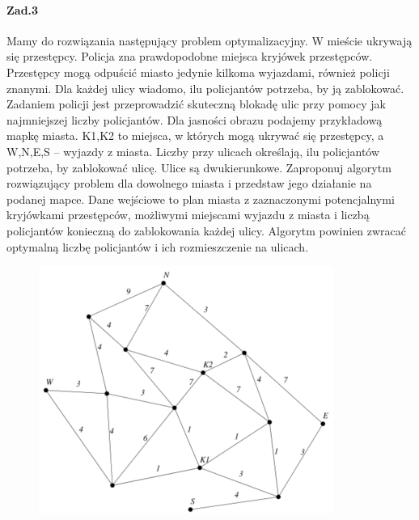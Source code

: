\documentclass[a4paper,12pt]{article}
\theoremstyle{definition}%
\theoremstyle{definition}
\theoremstyle{problem}
\begin{document}
\paragraph{Zad.3} Mamy do rozwiązania następujący problem optymalizacyjny. W mieście ukrywają się przestępcy. Policja zna prawdopodobne miejsca kryjówek przestępców. Przestępcy mogą odpuścić miasto jedynie kilkoma wyjazdami, również policji znanymi. Dla każdej ulicy wiadomo, ilu policjantów potrzeba, by ją zablokować. Zadaniem policji jest przeprowadzić skuteczną blokadę ulic przy pomocy jak najmniejszej liczby policjantów. Dla jasności obrazu podajemy przykładową mapkę miasta. K1,K2 to miejsca, w których mogą ukrywać się przestępcy, a W,N,E,S – wyjazdy z miasta. Liczby przy ulicach określają, ilu policjantów potrzeba, by zablokować ulicę. Ulice są dwukierunkowe. Zaproponuj algorytm rozwiązujący problem dla dowolnego miasta i przedstaw jego działanie na podanej mapce. Dane wejściowe to plan miasta z zaznaczonymi potencjalnymi kryjówkami przestępców, możliwymi miejscami wyjazdu z miasta i liczbą policjantów konieczną do zablokowania każdej ulicy. Algorytm powinien zwracać optymalną liczbę policjantów i ich rozmieszczenie na ulicach.
\begin{figure}
\centering
\includegraphics[width=.8\textwidth]{img/7_Z3}
\end{figure}
\end{document}

